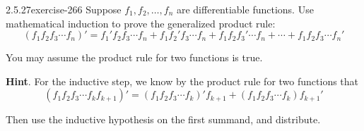 \documentclass[twoside,11pt,]{book}
\numberwithin{equation}{chapter}
\begin{document}
\begin{divisionsolution}{2.5.27}{}{exercise-266}%
\hypertarget{p-3695}{}%
Suppose \(f_1, f_2, \ldots, f_n\) are differentiable functions. Use mathematical induction to prove the generalized product rule:%
\begin{equation*}
(f_1 f_2 f_3 \cdots f_n)' = f_1' f_2 f_3 \cdots f_n + f_1 f_2' f_3 \cdots f_n + f_1 f_2 f_3' \cdots f_n + \cdots + f_1 f_2 f_3 \cdots f_n'
\end{equation*}
%
\par
\hypertarget{p-3696}{}%
You may assume the product rule for two functions is true.%
\par\smallskip%
\noindent\textbf{Hint}.\quad%
\hypertarget{p-3697}{}%
For the inductive step, we know by the product rule for two functions that%
\begin{equation*}
(f_1f_2f_3 \cdots f_k f_{k+1})' = (f_1f_2f_3\cdots f_k)'f_{k+1} + (f_1f_2f_3\cdots f_k)f_{k+1}'
\end{equation*}
%
\par
\hypertarget{p-3698}{}%
Then use the inductive hypothesis on the first summand, and distribute.%
\end{divisionsolution}%
\end{document}
